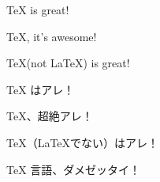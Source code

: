\documentclass[a4paper]{jsarticle}
\newcommand\myTeX{\TeX\xspace}
\begin{document}
\xkanjiskip 20pt
\kanjiskip 10pt
\myTeX is great!\par
\myTeX, it's awesome!\par
\myTeX (not \LaTeX) is great!\par
\myTeX はアレ！\par
\myTeX、超絶アレ！\par
\myTeX （\LaTeX でない）はアレ！\par
\myTeX 言語、ダメゼッタイ！\par
\end{document}
